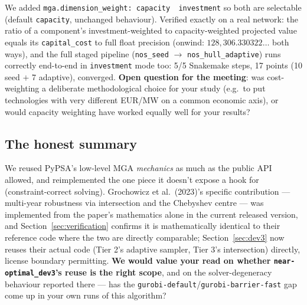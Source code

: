 \documentclass[11pt]{article}
\begin{document}
We added \texttt{mga.dimension\_weight: capacity \textbar\ investment} so
both are selectable (default \texttt{capacity}, unchanged behaviour).
Verified exactly on a real network: the ratio of a component's
investment-weighted to capacity-weighted projected value equals its
\texttt{capital\_cost} to full float precision (onwind:
$128{,}306.330322\ldots$ both ways), and the full staged pipeline
(\texttt{nos\_seed} $\to$ \texttt{nos\_hull\_adaptive}) runs correctly
end-to-end in \texttt{investment} mode too: 5/5 Snakemake steps, 17 points
(10 seed $+$ 7 adaptive), converged. \textbf{Open question for the
meeting}: was cost-weighting a deliberate methodological choice for your
study (e.g.\ to put technologies with very different EUR/MW on a common
economic axis), or would capacity weighting have worked equally well for
your results?

\subsection{The honest summary}
\label{sec:honest-summary}
We reused PyPSA's low-level MGA \emph{mechanics} as much as the public API
allowed, and reimplemented the one piece it doesn't expose a hook for
(constraint-correct solving). Grochowicz et al.\ (2023)'s specific
contribution --- multi-year robustness via intersection and the Chebyshev
centre --- was implemented from the paper's mathematics alone in the current
released version, and Section~\ref{sec:verification} confirms it is
mathematically identical to their reference code where the two are directly
comparable; Section~\ref{sec:dev3} now reuses their actual code (Tier 2's
adaptive sampler, Tier 3's intersection) directly, license boundary
permitting. \textbf{We would value your read on whether
\texttt{near-optimal\_dev3}'s reuse is the right scope}, and on the
solver-degeneracy behaviour reported there --- has the
\texttt{gurobi-default}/\texttt{gurobi-barrier-fast} gap come up in your own
runs of this algorithm?

\end{document}

